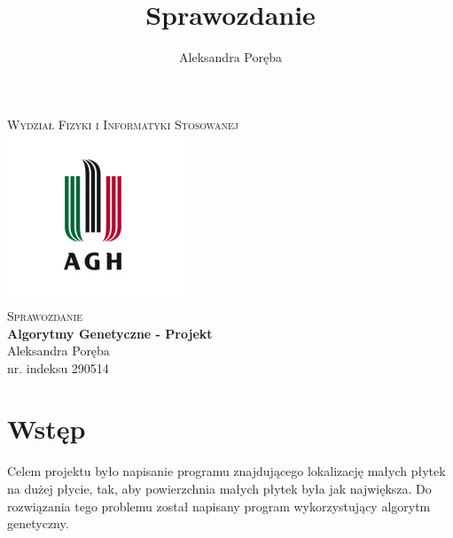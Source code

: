 \documentclass[11pt]{article}
\title{Sprawozdanie}
\author{Aleksandra Poręba}
\makeatletter
\let\thetitle\@title
\let\theauthor\@author
\makeatother
\begin{document}
\begin{center}
\textsc{\normalsize Wydział Fizyki i Informatyki Stosowanej}\\[2.0cm] 
\includegraphics[scale = 1]{logo.png}\\[1cm] 


\textsc{\Large Sprawozdanie}\\[0.4cm]
{ \huge \bfseries \LARGE{Algorytmy Genetyczne - Projekt} }\\[1cm] 

\flushright \Large Aleksandra Poręba \\ nr. indeksu 290514

\vfill 

\center{\today}


\pagebreak 

\end{center}



\pagestyle{fancy}
\fancyhf{}

\rhead{\theauthor}
\lhead{\thetitle}
\cfoot{\thepage}

\section{Wstęp}
Celem projektu było napisanie programu znajdującego lokalizację małych płytek na dużej płycie, tak, aby powierzchnia małych płytek była jak największa. Do rozwiązania tego problemu został napisany program wykorzystujący algorytm genetyczny.
\end{document}
